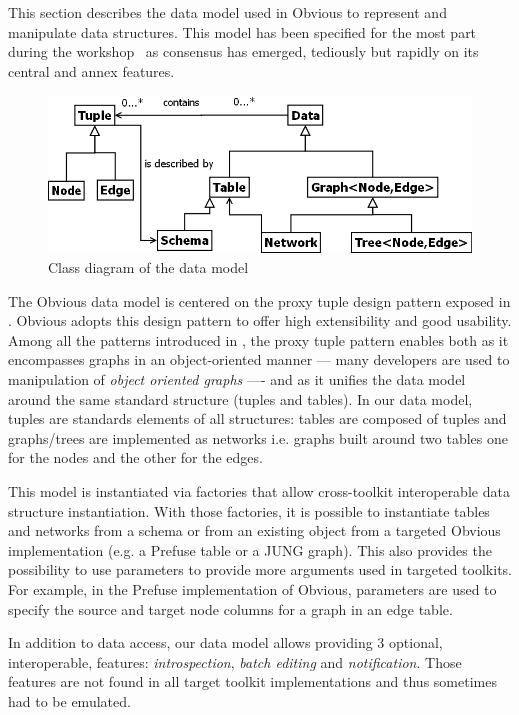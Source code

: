 This section describes the data model used in Obvious to represent and
manipulate data structures.  This model has been specified for the
most part during the workshop~\cite{vismaster2008} as consensus has
emerged, tediously but rapidly on its central and annex features.

\begin{figure}[!ht]
\centering
\includegraphics[width=0.8\columnwidth]{figures/obviousdataclass}
\caption{Class diagram of the data model}
\label{fig:datamodel}
\end{figure}

The Obvious data model is centered on the proxy tuple design pattern
exposed in \cite{DesignPatternsIV}. Obvious adopts this design pattern
to offer high extensibility and good usability.  Among all the patterns
introduced in \cite{DesignPatternsIV}, the proxy tuple pattern enables
both as it encompasses graphs in an object-oriented manner --- many
developers are used to manipulation of \emph{object oriented graphs}
---- and as it unifies the data model around the same standard
structure (tuples and tables). In our data model, tuples are standards
elements of all structures: tables are composed of tuples and
graphs/trees are implemented as networks i.e. graphs built around two
tables one for the nodes and the other for the edges.

This model is instantiated via factories that allow cross-toolkit
interoperable data structure instantiation. With those factories, it
is possible to instantiate tables and networks from a schema or from
an existing object from a targeted Obvious implementation (e.g. a
Prefuse table or a JUNG graph). This also provides the possibility
to use parameters to provide more arguments used in targeted
toolkits. For example, in the Prefuse implementation of Obvious,
parameters are used to specify the source and target node columns for
a graph in an edge table.

In addition to data access, our data model allows providing 3
optional, interoperable, features: \emph{introspection}, \emph{batch
  editing} and \emph{notification}. Those features are not found in
all target toolkit implementations and thus sometimes had to be
emulated.
 
